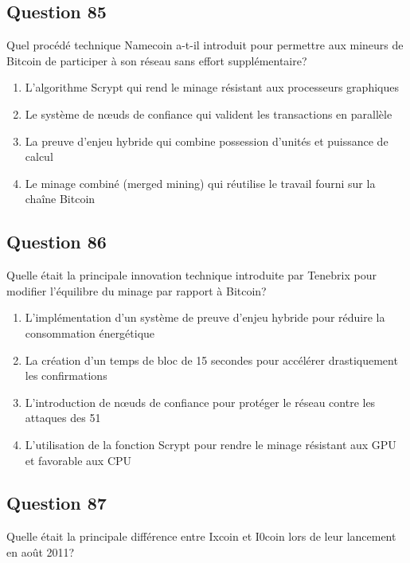 \documentclass[12pt,a4paper]{article}
\begin{document}
\bigskip


\subsection*{Question 85}
Quel procédé technique Namecoin a-t-il introduit pour permettre aux mineurs de Bitcoin de participer à son réseau sans effort supplémentaire?

\begin{enumerate}[label=\Alph*., leftmargin=*]
\item L'algorithme Scrypt qui rend le minage résistant aux processeurs graphiques
\item Le système de nœuds de confiance qui valident les transactions en parallèle
\item La preuve d'enjeu hybride qui combine possession d'unités et puissance de calcul
\item Le minage combiné (merged mining) qui réutilise le travail fourni sur la chaîne Bitcoin
\end{enumerate}

\bigskip


\subsection*{Question 86}
Quelle était la principale innovation technique introduite par Tenebrix pour modifier l'équilibre du minage par rapport à Bitcoin?

\begin{enumerate}[label=\Alph*., leftmargin=*]
\item L'implémentation d'un système de preuve d'enjeu hybride pour réduire la consommation énergétique
\item La création d'un temps de bloc de 15 secondes pour accélérer drastiquement les confirmations
\item L'introduction de nœuds de confiance pour protéger le réseau contre les attaques des 51%
\item L'utilisation de la fonction Scrypt pour rendre le minage résistant aux GPU et favorable aux CPU
\end{enumerate}

\bigskip


\subsection*{Question 87}
Quelle était la principale différence entre Ixcoin et I0coin lors de leur lancement en août 2011?
\end{document}
